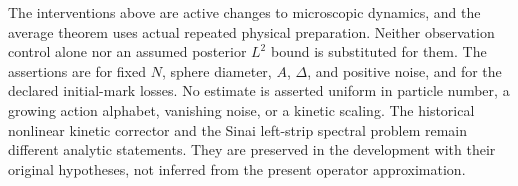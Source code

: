 \begin{remark}
The interventions above are active changes to microscopic dynamics,
and the average theorem uses actual repeated physical preparation.
Neither observation control alone nor an assumed posterior $L^2$
bound is substituted for them. The assertions are for fixed $N$,
sphere diameter, $A$, $\Delta$, and positive noise, and for the declared
initial-mark losses. No estimate is asserted uniform in particle
number, a growing action alphabet, vanishing noise, or a kinetic
scaling. The historical nonlinear kinetic corrector and the Sinai
left-strip spectral problem remain different analytic statements.
They are preserved in the development with their original hypotheses,
not inferred from the present operator approximation.
\end{remark}
